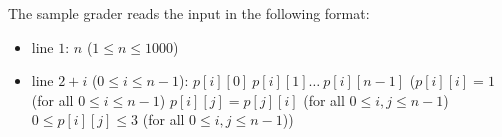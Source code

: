 The sample grader reads the input in the following format:
\begin{itemize}
\item line $1$: $n$ ($1 \leq n \leq 1000$)
\item line $2 + i$ ($0 \leq i \leq n - 1$): $p[i][0]\ p[i][1]\ldots \ p[i][n-1]$ ($p[i][i] = 1$ (for all $0 \leq i \leq n-1$) $p[i][j] = p[j][i]$ (for all $0 \leq i, j \leq n-1$) $0 \leq p[i][j] \leq 3$ (for all $0 \leq i, j \leq n-1$))
\end{itemize}
